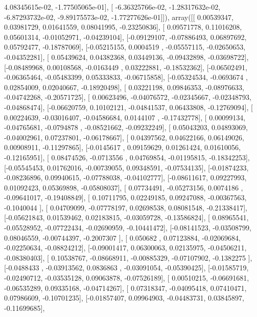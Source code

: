 \documentclass{article}
\begin{document}
          4.08345615e-02,  -1.77505065e-01],
       [ -6.36325766e-02,  -1.28317632e-02,  -6.87293732e-02,
         -9.89175573e-02,  -1.77277626e-01]]), array([[ 0.00539347,  0.03981729,  0.01641559,  0.08041995, -0.23250836],
       [ 0.09571778,  0.11016208,  0.05601314, -0.01052971, -0.04239104],
       [-0.09129107, -0.07886493,  0.06897692,  0.05792477, -0.18787069],
       [-0.05215155,  0.0004519 , -0.05557115, -0.02650653, -0.04352281],
       [ 0.05439624,  0.04382368,  0.03449136, -0.09432898, -0.03698722],
       [-0.08489968,  0.00108568, -0.0163449 ,  0.03222881, -0.18532362],
       [-0.06502491, -0.06365464, -0.05483399,  0.05333833, -0.06715858],
       [-0.05324534, -0.0693674 ,  0.02854009,  0.02040667, -0.18920498],
       [ 0.03221198,  0.09846353, -0.08976633, -0.04742268, -0.20571725],
       [ 0.00623496, -0.04076572, -0.02345667, -0.02348793, -0.04868474],
       [-0.06620759,  0.10102121, -0.04841537,  0.06433808, -0.12769094],
       [ 0.00224639, -0.03016407, -0.04586684,  0.0144107 , -0.17432778],
       [ 0.00099134, -0.04765681, -0.0794878 , -0.08521662, -0.09232249],
       [ 0.05043203,  0.04893069, -0.04002961,  0.07237801, -0.06178667],
       [ 0.04397562,  0.04622166,  0.06149026,  0.00908911, -0.11297865],
       [-0.0145617 ,  0.09159629,  0.01261424,  0.01610056, -0.12165951],
       [ 0.08474526, -0.0713556 ,  0.04769854, -0.01195815, -0.18342253],
       [-0.05545453,  0.01762016, -0.00739055,  0.09348591, -0.07534135],
       [-0.01874233, -0.08236896,  0.09940615, -0.07788038, -0.04102777],
       [-0.08611617,  0.09227993,  0.01092423,  0.05369898, -0.05808037],
       [ 0.07734491, -0.05273156,  0.0074186 , -0.09641017, -0.19408849],
       [ 0.10711795,  0.02249185,  0.09247088, -0.00367563, -0.1040044 ],
       [ 0.04709099, -0.07778197,  0.02698538,  0.08081548, -0.21338417],
       [-0.05621843,  0.01539462,  0.02183815, -0.03059728, -0.13586824],
       [ 0.08965541, -0.05528952, -0.07722434, -0.02690959, -0.10441472],
       [-0.08141523, -0.03508799,  0.08046559, -0.00744397, -0.2007307 ],
       [ 0.050682  ,  0.07123884, -0.02069684, -0.02250634, -0.08824212],
       [-0.09001417,  0.06300063,  0.02135975, -0.04506211, -0.08380403],
       [ 0.10538767, -0.08668911, -0.00885329, -0.07107902, -0.1382275 ],
       [-0.0488433 , -0.03913562,  0.0836863 , -0.03091054, -0.05390425],
       [-0.01585719, -0.02490712, -0.03535128,  0.09063878, -0.07526189],
       [ 0.00510215, -0.06691681, -0.06535289,  0.09335168, -0.04714267],
       [ 0.07318347, -0.04095418,  0.07410471,  0.07986609, -0.10701235],
       [-0.01857407,  0.09964903, -0.04483731,  0.03845897, -0.11699685],
\end{document}
